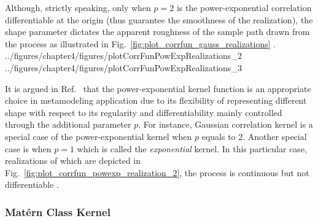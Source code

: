 Although, strictly speaking, only when $p = 2$ is the power-exponential correlation differentiable at the origin (thus guarantee the smoothness of the realization),
the shape parameter dictates the apparent roughness of the sample path drawn from the process as illustrated in Fig.~\ref{fig:plot_corrfun_gauss_realizations} \cite{Rasmussen2006}.
{../figures/chapter4/figures/plotCorrFunPowExpRealizations_2}
{../figures/chapter4/figures/plotCorrFunPowExpRealizations_3}

It is argued in Ref.~\cite{Marrel2008} that the power-exponen\-tial kernel function is an appropriate choice in metamodeling application due to its flexibility of representing different shape with respect to its regularity and differentiability mainly controlled through the additional parameter $p$.
For instance, Gaussian correlation kernel is a special case of the power-exponential kernel when $p$ equals to 2. 
Another special case is when $p = 1$ which is called the \emph{exponential} kernel.
In this particular case, realizations of which are depicted in Fig.~\ref{fig:plot_corrfun_powexp_realization_2}, the process is continuous but not differentiable \cite{Rasmussen2006}.

\subsubsection{Mat\'ern Class Kernel}\label{subsub:gp_matern_cov}

